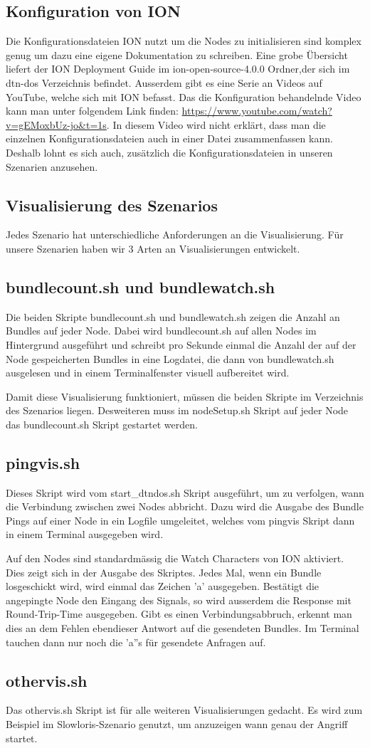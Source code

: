 \documentclass{article}
\begin{document}
\subsection{Konfiguration von ION}
Die Konfigurationsdateien ION nutzt um die Nodes zu initialisieren sind komplex genug um dazu eine eigene Dokumentation zu schreiben. Eine grobe Übersicht liefert der ION Deployment Guide im ion-open-source-4.0.0 Ordner,der sich im dtn-dos Verzeichnis befindet. Ausserdem gibt es eine Serie an Videos auf YouTube, welche sich mit ION befasst. Das die Konfiguration behandelnde Video kann man unter folgendem Link finden: \url{https://www.youtube.com/watch?v=gEMoxbUz-jo&t=1s}. In diesem Video wird nicht erklärt, dass man die einzelnen Konfigurationsdateien auch in einer Datei zusammenfassen kann. Deshalb lohnt es sich auch, zusätzlich die Konfigurationsdateien in unseren Szenarien anzusehen.  
\subsection{Visualisierung des Szenarios}
Jedes Szenario hat unterschiedliche Anforderungen an die Visualisierung. Für unsere Szenarien haben wir 3 Arten an Visualisierungen entwickelt. 
\subsection{bundlecount.sh und bundlewatch.sh}
Die beiden Skripte bundlecount.sh und bundlewatch.sh zeigen die Anzahl an Bundles auf jeder Node. Dabei wird bundlecount.sh auf allen Nodes im Hintergrund ausgeführt und schreibt pro Sekunde einmal die Anzahl der auf der Node gespeicherten Bundles in eine Logdatei, die dann von bundlewatch.sh ausgelesen und in einem Terminalfenster visuell aufbereitet wird.\par
Damit diese Visualisierung funktioniert, müssen die beiden Skripte im Verzeichnis des Szenarios liegen. Desweiteren muss im nodeSetup.sh Skript auf jeder Node das bundlecount.sh Skript gestartet werden.
\subsection{pingvis.sh}
Dieses Skript wird vom start\_dtndos.sh Skript ausgeführt, um zu verfolgen, wann die Verbindung zwischen zwei Nodes abbricht. Dazu wird die Ausgabe des Bundle Pings auf einer Node in ein Logfile umgeleitet, welches vom pingvis Skript dann in einem Terminal ausgegeben wird.\par
Auf den Nodes sind standardmässig die Watch Characters von ION aktiviert. Dies zeigt sich in der Ausgabe des Skriptes. Jedes Mal, wenn ein Bundle losgeschickt wird, wird einmal das Zeichen 'a' ausgegeben. Bestätigt die angepingte Node den Eingang des Signals, so wird ausserdem die Response mit  Round-Trip-Time ausgegeben. Gibt es einen Verbindungsabbruch, erkennt man dies an dem Fehlen ebendieser Antwort auf die gesendeten Bundles. Im Terminal tauchen dann nur noch die 'a''s für gesendete Anfragen auf. 
\subsection{othervis.sh}
Das othervis.sh Skript ist für alle weiteren Visualisierungen gedacht. Es wird zum Beispiel im Slowloris-Szenario genutzt, um anzuzeigen wann genau der Angriff startet. 




\newpage
\printbibliography
\end{document}
